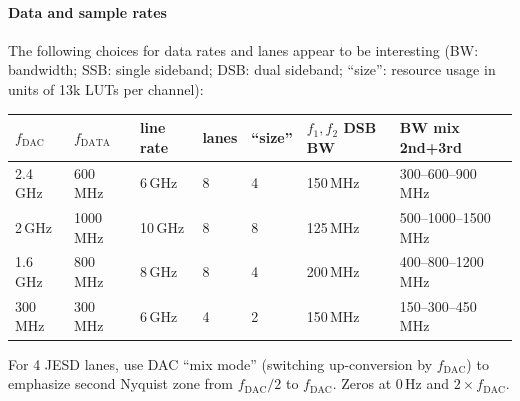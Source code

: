 \documentclass[11pt]{paper}
\begin{document}
\paragraph{Data and sample rates} The following choices for data rates and
lanes appear to be interesting (BW: bandwidth; SSB: single sideband; DSB: dual
sideband; ``size'': resource usage in units of 13k LUTs per channel):

\noindent
\begin{tabular}{lllllll}
   $f_\mathrm{DAC}$ & $f_\mathrm{DATA}$ & line rate
   & lanes & ``size'' & $f_1,f_2$ DSB BW & BW mix 2nd+3rd \\\hline
   2.4\,GHz & 600\,MHz & 6\,GHz & 8 & 4 & 150\,MHz & 300--600--900\,MHz \\
   2\,GHz & 1000\,MHz & 10\,GHz & 8 & 8 & 125\,MHz & 500--1000--1500\,MHz \\
   1.6\,GHz & 800\,MHz & 8\,GHz & 8 & 4 & 200\,MHz & 400--800--1200\,MHz \\
   300\,MHz & 300\,MHz & 6\,GHz & 4 & 2 & 150\,MHz & 150--300--450\,MHz \\
\end{tabular}

For 4 JESD lanes, use DAC ``mix mode'' (switching up-conversion by $f_\mathrm{DAC}$) to
emphasize second Nyquist zone from $f_\mathrm{DAC}/2$ to $f_\mathrm{DAC}$. Zeros at 0\,Hz
and $2\times f_\mathrm{DAC}$.
\end{document}
